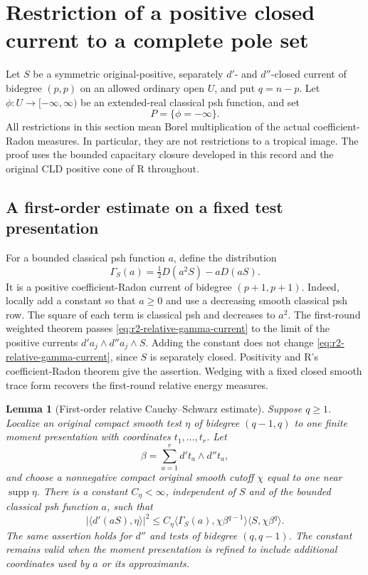 \documentclass[11pt,a4paper]{article}
\numberwithin{equation}{section}
\newtheorem{lemma}[theorem]{Lemma}
\theoremstyle{definition}
\theoremstyle{remark}
\begin{document}


\section{Restriction of a positive closed current to a complete pole set}
\label{sec:r2-polar-restriction}

Let $S$ be a symmetric original-positive, separately $d'$- and
$d''$-closed current of bidegree $(p,p)$ on an allowed ordinary
open $U$, and put $q=n-p$. Let $\phi:U\to[-\infty,\infty)$ be
an extended-real classical psh function, and set
\[
 P=\{\phi=-\infty\}.
\]
All restrictions in this section mean Borel multiplication of the
actual coefficient-Radon measures. In particular, they are not
restrictions to a tropical image. The proof uses the bounded
capacitary closure developed in this record and the original CLD
positive cone of R throughout.

\subsection{A first-order estimate on a fixed test presentation}

For a bounded classical psh function $a$, define the distribution
\begin{equation}
\label{eq:r2-relative-gamma-current}
 \Gamma_S(a)=\tfrac12D(a^2S)-aD(aS).
\end{equation}
It is a positive coefficient-Radon current of bidegree $(p+1,p+1)$.
Indeed, locally add a constant so that $a\geq0$ and use a decreasing
smooth classical psh row. The square of each term is classical psh
and decreases to $a^2$. The first-round weighted theorem passes
\eqref{eq:r2-relative-gamma-current} to the limit of the positive
currents $d'a_j\wedge d''a_j\wedge S$. Adding the constant does
not change \eqref{eq:r2-relative-gamma-current}, since $S$ is
separately closed. Positivity and R's coefficient-Radon theorem
give the assertion. Wedging with a fixed closed smooth trace form
recovers the first-round relative energy measures.

\begin{lemma}[First-order relative Cauchy--Schwarz estimate]
\label{lem:r2-first-order-CS}
Suppose $q\geq1$. Localize an original compact smooth test
$\eta$ of bidegree $(q-1,q)$ to one finite moment presentation
with coordinates $t_1,\ldots,t_r$. Let
\[
 \beta=\sum_{a=1}^r d't_a\wedge d''t_a,
\]
and choose a nonnegative compact original smooth cutoff $\chi$
equal to one near $\operatorname{supp}\eta$. There is a constant
$C_\eta<\infty$, independent of $S$ and of the bounded classical
psh function $a$, such that
\begin{equation}
\label{eq:r2-first-order-CS}
 \bigl|\langle d'(aS),\eta\rangle\bigr|^2
 \leq C_\eta
       \langle\Gamma_S(a),\chi\beta^{q-1}\rangle
       \langle S,\chi\beta^q\rangle.
\end{equation}
The same assertion holds for $d''$ and tests of bidegree $(q,q-1)$.
The constant remains valid when the moment presentation is refined
to include additional coordinates used by $a$ or its approximants.
\end{lemma}
\end{document}
